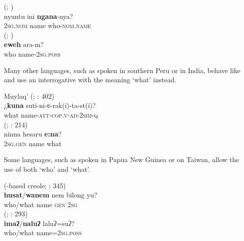 \documentclass[output=paper,colorlinks,citecolor=brown]{langscibook}
\begin{document}
\ea
    \label{example4.1}
     (; \citealt[19]{Mushin1995})\\
    \gll nyuntu	ini \textbf{ngana}-nya?\\
    	 2\textsc{sg.nom} name who-\textsc{nom.name}\\
\ex
    \label{example4.2}
     (; \citealt[510]{Blust2013})\\
    \gll \textbf{eweh} ara-m?\\
    who name-2\textsc{sg.poss}\\
    \z

Many other languages, such as  spoken in southern Peru or  in India, behave like  and use an interrogative with the meaning ‘what’ instead.

\ea
    \label{example4.3}
    Muylaq’  (; \citealt{Coler2014}: 402)\\
    \gll ¿\textbf{kuna}	suti-ni-ʋ-rak(i)-ta-st(i)?\\
    what name-\textsc{att-cop.v-ad-2sim-q}\\
\ex
    \label{example4.4}
     (; \citealt{Balakrishnan1999}: 214)\\
    \gll ninna hesaru \textbf{e:na}?\\
    2\textsc{sg.gen} name what\\
\z

Some languages, such as  spoken in Papua New Guinea or  on Taiwan, allow the use of both ‘who’ and ‘what’.

\ea
    \label{example4.5}
     (-based creole; \citealt{Wurm1985}: 345)\\
    \gll \textbf{husat}/\textbf{wanem}	nem		bilong	yu?\\
    who/what			name	\textsc{gen}		2\textsc{sg}\\
\ex
    \label{example4.6}
     (; \citealt[293]{Huang1996}: 293)\\
    \gll \textbf{imaʔ}/\textbf{naluʔ}		laluʔ=suʔ?\\
    who/what		name=2\textsc{sg.poss}\\
\z
\end{document}
